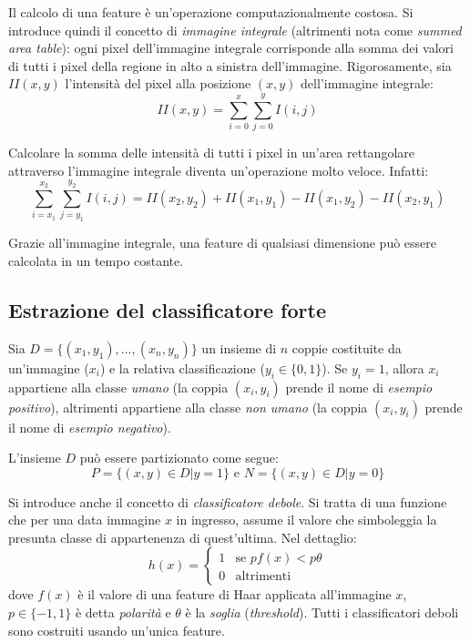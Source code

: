 \documentclass[a4paper,11pt,oneside]{article}
\begin{document}
				Il calcolo di una feature è un'operazione computazionalmente costosa. Si introduce quindi il concetto di \emph{immagine integrale} (altrimenti nota come \emph{summed area table}): ogni pixel dell'immagine integrale corrisponde alla somma dei valori di tutti i pixel della regione in alto a sinistra dell'immagine. 
				Rigorosamente, sia $II(x,y)$ l'intensità del pixel alla posizione $(x,y)$ dell'immagine integrale: $$ II(x, y) = \sum_{i = 0}^{x} \sum_{j = 0}^{y} I(i, j) $$

				Calcolare la somma delle intensità di tutti i pixel in un'area rettangolare attraverso l'immagine integrale diventa un'operazione molto veloce.
				Infatti: $$ \sum_{i = x_1}^{x_2} \sum_{j = y_1}^{y_2} I(i,j) = 
				II(x_2, y_2) + II(x_1, y_1) - II(x_1, y_2) - II(x_2, y_1)$$

				Grazie all'immagine integrale, una feature di qualsiasi dimensione può essere calcolata in un tempo costante.


		\subsection{Estrazione del classificatore forte} %
		\label{sub:estrazione_del_classificatore_forte}
			Sia $D = \{(x_1, y_1), ..., (x_n, y_n)\}$ un insieme di $n$ coppie costituite da un'immagine ($x_i$) e la relativa classificazione ($y_i \in \{ 0, 1 \}$). Se $y_i = 1$, allora $x_i$ appartiene alla classe \emph{umano} (la coppia $(x_i, y_i)$ prende il nome di \emph{esempio positivo}), altrimenti appartiene alla classe \emph{non umano} (la coppia $(x_i, y_i)$ prende il nome di \emph{esempio negativo}).

			L'insieme $D$ può essere partizionato come segue: 
			$$P = \{(x, y) \in D | y = 1\} \text{ e } N = \{(x,y) \in D | y = 0\}$$

			Si introduce anche il concetto di \emph{classificatore debole}. Si tratta di una funzione che per una data immagine $x$ in ingresso, assume il valore che simboleggia la presunta classe di appartenenza di quest'ultima.
			Nel dettaglio:
			\begin{equation}
				h(x) = \begin{cases}
					1 & \text{se $pf(x) < p\theta$}\\
					0 & \text{altrimenti}
				\end{cases}
			\end{equation}
			dove $f(x)$ è il valore di una feature di Haar applicata all'immagine $x$, $p \in \{-1,1\}$ è detta \emph{polarità} e $\theta$ è la \emph{soglia} (\emph{threshold}). Tutti i classificatori deboli sono costruiti usando un'unica feature.
\end{document}
